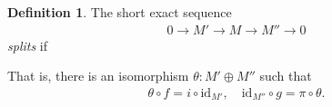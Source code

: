 \documentclass[12pt]{report}
\theoremstyle{plain}
\theoremstyle{remark}
\theoremstyle{definition}
\newtheorem{definition}[theorem]{Definition}
\begin{document}
\begin{definition}
    The short exact sequence
    \begin{align*}
        0\rightarrow M' \rightarrow M\rightarrow M''\rightarrow 0
    \end{align*}
    \emph{splits} if
    \begin{figure}[H]
        \centering
    \end{figure}
    \noindent That is, there is an isomorphism $\theta:M'\oplus M''$ such that
    \begin{align*}
        \theta\circ f = i\circ \mathrm{id}_{M'},\quad \mathrm{id}_{M''}\circ g = \pi\circ \theta.
    \end{align*}
\end{definition}
\end{document}
